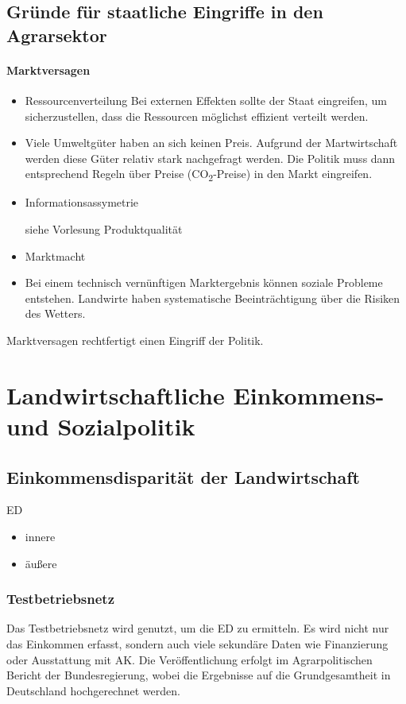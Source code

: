 \documentclass[11pt]{scrartcl}
\begin{document}
\subsection{Gründe für staatliche Eingriffe in den Agrarsektor}

\paragraph{Marktversagen} 
\begin{itemize}
	\item Ressourcenverteilung
		Bei externen Effekten sollte der Staat eingreifen, um sicherzustellen, dass die Ressourcen möglichst effizient verteilt werden.

	\item Viele Umweltgüter haben an sich keinen Preis.
Aufgrund der Martwirtschaft werden diese Güter relativ stark nachgefragt werden.
Die Politik muss dann entsprechend Regeln über Preise (CO\textsubscript{2}-Preise) in den Markt eingreifen.

\item Informationsassymetrie
	
	siehe Vorlesung Produktqualität

\item Marktmacht

\item Bei einem technisch vernünftigen Marktergebnis können soziale Probleme entstehen.
	Landwirte haben systematische Beeinträchtigung über die Risiken des Wetters.
\end{itemize}

Marktversagen rechtfertigt einen Eingriff der Politik.


\section{Landwirtschaftliche Einkommens- und Sozialpolitik}
\subsection{Einkommensdisparität der Landwirtschaft}
\acl{ED}
\begin{itemize}
	\item innere
	\item äußere
\end{itemize}

\subsubsection{Testbetriebsnetz}
Das Testbetriebsnetz wird genutzt, um die \ac{ED} zu ermitteln.
Es wird nicht nur das Einkommen erfasst, sondern auch viele sekundäre Daten wie Finanzierung oder Ausstattung mit AK.
Die Veröffentlichung erfolgt im \glqq Agrarpolitischen Bericht der Bundesregierung\grqq{}, wobei die Ergebnisse auf die Grundgesamtheit in Deutschland hochgerechnet werden.
\end{document}
